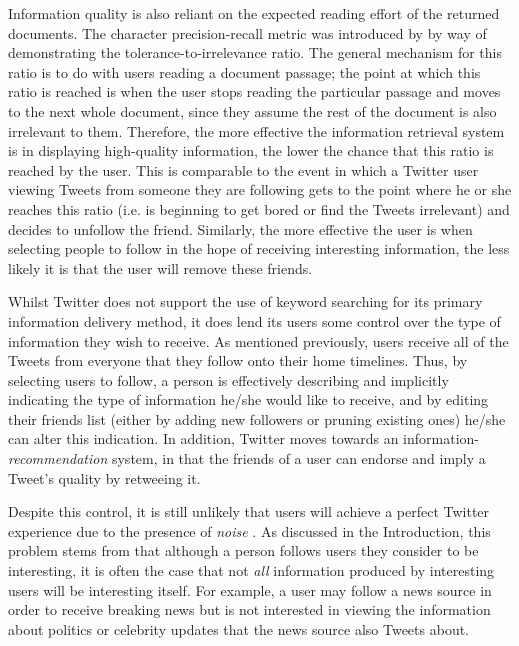 Information quality is also reliant on the expected reading effort of the returned documents. The character precision-recall metric was introduced by \cite{arvola10} by way of demonstrating the tolerance-to-irrelevance ratio. The general mechanism for this ratio is to do with users reading a document passage; the point at which this ratio is reached is when the user stops reading the particular passage and moves to the next whole document, since they assume the rest of the document is also irrelevant to them. Therefore, the more effective the information retrieval system is in displaying high-quality information, the lower the chance that this ratio is reached by the user. This is comparable to the event in which a Twitter user viewing Tweets from someone they are following gets to the point where he or she reaches this ratio (i.e. is beginning to get bored or find the Tweets irrelevant) and decides to unfollow the friend. Similarly, the more effective the user is when selecting people to follow in the hope of receiving interesting information, the less likely it is that the user will remove these friends.

Whilst Twitter does not support the use of keyword searching for its primary information delivery method, it does lend its users some control over the type of information they wish to receive. As mentioned previously, users receive all of the Tweets from everyone that they follow onto their home timelines. Thus, by selecting users to follow, a person is effectively describing and implicitly indicating the type of information he/she would like to receive, and by editing their friends list (either by adding new followers or pruning existing ones) he/she can alter this indication. In addition, Twitter moves towards an information-\textit{recommendation} system, in that the friends of a user can endorse and imply a Tweet's quality by retweeing it.

Despite this control, it is still unlikely that users will achieve a perfect Twitter experience due to the presence of \textit{noise} \cite{alonso10}. As discussed in the Introduction, this problem stems from that although a person follows users they consider to be interesting, it is often the case that not \textit{all} information produced by interesting users will be interesting itself. For example, a user may follow a news source in order to receive breaking news but is not interested in viewing the information about politics or celebrity updates that the news source also Tweets about.


